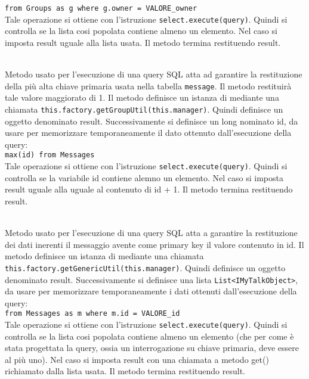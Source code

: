 \begin{description}
	\verb|from Groups as g where g.owner = VALORE_owner|\\
	
	Tale operazione si ottiene con l'istruzione \verb|select.execute(query)|. Quindi si controlla se la lista cosi popolata contiene almeno un elemento. Nel caso si imposta result uguale alla lista usata. Il metodo termina restituendo result.
	
	\item{}\\
	Metodo usato per l'esecuzione di una query SQL atta ad garantire la restituzione della più alta chiave primaria usata nella tabella \texttt{message}. Il metodo restituirà tale valore maggiorato di 1. Il metodo definisce un istanza di  mediante una chiamata \verb|this.factory.getGroupUtil(this.manager)|. Quindi definisce un oggetto  denominato result. Successivamente si definisce un long nominato id, da usare per memorizzare temporaneamente il dato ottenuto dall'esecuzione della query:\\
	
	\verb|max(id) from Messages|\\
	
	Tale operazione si ottiene con l'istruzione \verb|select.execute(query)|. Quindi si controlla se la variabile id contiene alemno un elemento. Nel caso si imposta result uguale alla uguale al contenuto di id + 1. Il metodo termina restituendo result.
	
	\item{}\\
	Metodo usato per l'esecuzione di una query SQL atta a garantire la restituzione dei dati inerenti il messaggio avente come primary key il valore contenuto in id. Il metodo definisce un istanza di  mediante una chiamata \verb|this.factory.getGenericUtil(this.manager)|. Quindi definisce un oggetto  denominato result. Successivamente si definisce una lista \texttt{List<IMyTalkObject>}, da usare per memorizzare temporaneamente i dati ottenuti dall'esecuzione della query:\\
	
	\verb|from Messages as m where m.id = VALORE_id|\\
	
	Tale operazione si ottiene con l'istruzione \verb|select.execute(query)|. Quindi si controlla se la lista cosi popolata contiene almeno un elemento (che per come è stata progettata la query, ossia un interrogazione su chiave primaria, deve essere al più uno). Nel caso si imposta result con una chiamata a metodo get() richiamato dalla lista usata. Il metodo termina restituendo result.
	

\end{description}

